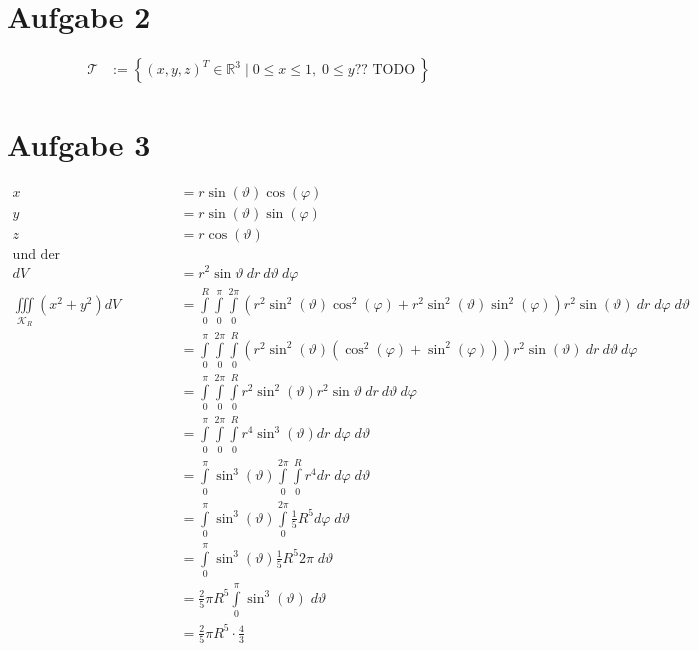 \documentclass[10pt,a4paper,parskip=half]{scrartcl}
\newcommand{\R}{\mathbb{R}}
\begin{document}
\section*{Aufgabe 2}
\begin{align*}
\mathcal{T} &:= \left\lbrace (x,y,z)^T \in \R^3 \mid 0\leq x \leq 1, \; 0\leq y \text{?? TODO}\ \right\rbrace
\end{align*}
\section*{Aufgabe 3}
\begin{align*}
x &= r \sin( \vartheta ) \cos(\varphi) \\
y &= r \sin(\vartheta) \sin(\varphi)\\
z &= r \cos( \vartheta)\\
\text{und der Funktionaldeterminanten} \\
dV &= r^2 \sin \vartheta~ dr ~d\vartheta ~d\varphi \\
\iiint\limits_{\mathcal{K}_R} \left( x^2 + y^2 \right) dV &= \int\limits_{0}^{R}\int\limits_{0}^{\pi} \int\limits_{0}^{2\pi} \left( r^2\sin^2(\vartheta)\cos^2(\varphi) + r^2\sin^2(\vartheta)\sin^2(\varphi) \right) r^2 \sin(\vartheta)~ dr \; d\varphi \; d\vartheta\\ 
&= \int\limits_{0}^{\pi} \int\limits_{0}^{2\pi}\int\limits_{0}^{R} \left( r^2\sin^2(\vartheta) \left( \cos^2(\varphi) + \sin^2(\varphi) \right) \right)  r^2 \sin(\vartheta)~ dr ~d\vartheta ~d\varphi\\
&= \int\limits_{0}^{\pi} \int\limits_{0}^{2\pi}\int\limits_{0}^{R}  r^2\sin^2(\vartheta)  r^2 \sin \vartheta~ dr ~d\vartheta ~d\varphi\\
&= \int\limits_{0}^{\pi} \int\limits_{0}^{2\pi}\int\limits_{0}^{R}  r^4\sin^3(\vartheta) dr \; d\varphi \; d\vartheta\\
&= \int\limits_{0}^{\pi} \sin^3(\vartheta) \int\limits_{0}^{2\pi}\int\limits_{0}^{R} r^4 dr \; d\varphi \; d\vartheta\\
&= \int\limits_{0}^{\pi} \sin^3(\vartheta)  \int\limits_{0}^{2\pi} \frac 15 R^5 d\varphi \; d\vartheta\\
&= \int\limits_{0}^{\pi} \sin^3(\vartheta)\frac 15 R^5 2\pi \; d\vartheta\\
&= \frac 25 \pi R^5 \int\limits_0^{\pi} \sin^3(\vartheta) \; d\vartheta\\
&= \frac 25 \pi R^5 \cdot \frac 43
\end{align*}
\end{document}
